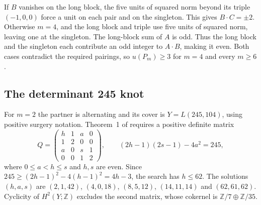 \documentclass[a4paper,11pt]{amsart}
\numberwithin{equation}{subsection}
\theoremstyle{plain}
\theoremstyle{remark}
\begin{document}
If $B$ vanishes on the long block, the five units of squared norm beyond its triple $(-1,0,0)$ force a unit on each pair and on the singleton. This gives $B\cdot C=\pm2$. Otherwise $m=4$, and the long block and triple use five units of squared norm, leaving one at the singleton. The long-block sum of $A$ is odd. Thus the long block and the singleton each contribute an odd integer to $A\cdot B$, making it even. Both cases contradict the required pairings, so $u(P_m)\geq3$ for $m=4$ and every $m\geq6$.

\subsection{The determinant 245 knot}\label{sub:determinant245}

For $m=2$ the partner is alternating and its cover is $Y=L(245,104)$, using positive surgery notation. Theorem~1 of \cite{Owens} requires a positive definite matrix
\[
Q=\begin{pmatrix}h&1&a&0\\1&2&0&0\\a&0&s&1\\0&0&1&2\end{pmatrix},\qquad
(2h-1)(2s-1)-4a^2=245,
\]
where $0\leq a<h\leq s$ and $h,s$ are even. Since $245\geq(2h-1)^2-4(h-1)^2=4h-3$, the search has $h\leq62$. The solutions $(h,a,s)$ are $(2,1,42)$, $(4,0,18)$, $(8,5,12)$, $(14,11,14)$ and $(62,61,62)$. Cyclicity of $H^2(Y;\mathbb Z)$ excludes the second matrix, whose cokernel is $\mathbb Z/7\oplus\mathbb Z/35$.
\end{document}
